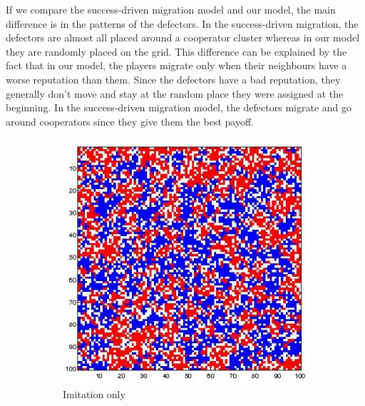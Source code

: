 \documentclass[11pt]{article}
\begin{document}
If we compare the success-driven migration model and our model, the main difference is in the patterns of the defectors. In the success-driven migration, the defectors are almost all placed around a cooperator cluster whereas in our model they are randomly placed on the grid. This difference can be explained by the fact that in our model, the players migrate only when their neighbours have a worse reputation than them. Since the defectors have a bad reputation, they generally don't move and stay at the random place they were assigned at the beginning. In the success-driven migration model, the defectors migrate and go around cooperators since they give them the best payoff.


\begin{figure}[H]
	\centering
	\begin{subfigure}[t]{0.26\textwidth}
        \includegraphics[width=\textwidth]{../../other/grids/m0-t200-a5-g300.jpg}
	\caption{Imitation only}
	\label{fig:grids_imitation0}
    	\end{subfigure}
	\begin{subfigure}[t]{0.26\textwidth}

\end{subfigure}
\end{figure}
\end{document}
